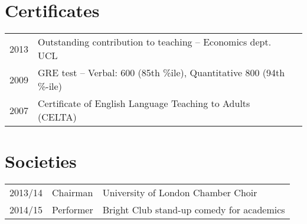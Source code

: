 \documentclass[a4paper,nomath]{deedy-resume} %
\begin{document}
\begin{minipage}[t]{0.66\textwidth}
    \sectionspace %

    \section{Certificates} 

    \begin{tabular}{rll}
        2013	 & Outstanding contribution to teaching -- Economics dept. UCL\\
        2009     & GRE test -- Verbal: 600 (85th \%ile), Quantitative 800 (94th \%-ile) \\
        2007     & Certificate of English Language Teaching to Adults (CELTA)
    \end{tabular}

    \sectionspace %


    \section{Societies} 

    \begin{tabular}{rll}
        2013/14 & Chairman & University of London Chamber Choir\\
        2014/15 & Performer & Bright Club stand-up comedy for academics\\
    \end{tabular}

    \sectionspace %


\end{minipage} %
\hfill
%
\end{document}
